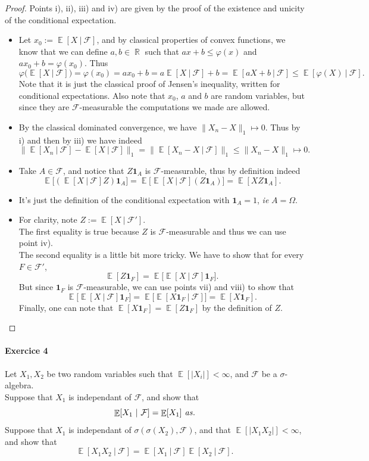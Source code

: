 \documentclass[10pt,a4paper]{article}
\theoremstyle{definition}
\numberwithin{equation}{section}
\DeclareMathOperator{\R}{\mathbb{R}}
\DeclareMathOperator{\E}{\mathbb{E}}
\begin{document}
\begin{proof}
Points i), ii), iii) and iv) are given by the proof of the existence and unicity of the conditional expectation.
\begin{itemize}
\item[v)] Let $x_0:=\E[X~|~\mathcal{F}]$, and by classical properties of convex functions, we know that we can define $a,b\in\R$ such that $ax+b\leq \varphi(x)$ and $ax_0+b=\varphi(x_0)$. Thus
$$\varphi\big(\E[X~|~\mathcal{F}]\big) = \varphi(x_0) = ax_0+b = a\E[X~|~\mathcal{F}]+b=\E[aX+b~|~\mathcal{F}]\leq \E[\varphi(X)~|~\mathcal{F}].$$
Note that it is just the classical proof of Jensen's inequality, written for conditional expectations. Also note that $x_0$, $a$ and $b$ are random variables, but since they are $\mathcal{F}$-measurable the computations we made are allowed.
\item[vi)] By the classical dominated convergence, we have $\|X_n-X\|_1\mapsto 0$. Thus by i) and then by iii) we have indeed
$$\| \E[X_n~|~\mathcal{F}]-\E[X~|~\mathcal{F}]\|_1 = \| \E[X_n-X~|~\mathcal{F}]\|_1 \leq \|X_n-X\|_1 \mapsto 0.$$
\item[vii)] Take $A\in\mathcal{F}$, and notice that $Z\mathbf{1}_A$ is $\mathcal{F}$-measurable, thus by definition indeed
$$\E\big[(\E[X~|~\mathcal{F}]Z)\mathbf{1}_A]=\E\big[\E[X~|~\mathcal{F}](Z\mathbf{1}_A)]=\E[XZ\mathbf{1}_A].$$
\item[viii)] It's just the definition of the conditional expectation with $\mathbf{1}_A = 1$, \textit{ie} $A=\Omega$.
\item[ix)] For clarity, note $Z:=\E[X~|~\mathcal{F}']$.\\
The first equality is true because $Z$ is $\mathcal{F}$-measurable and thus we can use point iv).\\
The second equality is a little bit more tricky. We have to show that for every $F\in \mathcal{F}'$, 
$$\E[Z\mathbf{1}_F]=\E\big[\E[X~|~\mathcal{F}]\mathbf{1}_F\big].$$
But since $\mathbf{1}_F$ is $\mathcal{F}$-measurable, we can use points vii) and viii) to show that
$$\E\big[\E[X~|~\mathcal{F}]\mathbf{1}_F\big] = \E\big[\E[X\mathbf{1}_F~|~\mathcal{F}]\big]=\E[X\mathbf{1}_F].$$
Finally, one can note that $\E[X\mathbf{1}_F]=\E[Z\mathbf{1}_F]$ by the definition of $Z$.
\end{itemize}
\end{proof}




\paragraph{Exercice 4}
Let $X_1,X_2$ be two random variables such that $\E[|X_i|]<\infty$, and $\mathcal{F}$ be a $\sigma$-algebra.\\
Suppose that $X_1$ is independant of $\mathcal{F}$, and show that
$$\E[X_1~|~\mathcal{F}]=\E[X_1] \text{\textit{   as}}.$$
Suppose that $X_1$ is independant of $\sigma(\sigma(X_2),\mathcal{F})$, and that $\E[|X_1X_2|]<\infty$, and show that
$$\E[X_1X_2~|~\mathcal{F}]=\E[X_1~|~\mathcal{F}]\E[X_2~|~\mathcal{F}].$$
\end{document}
